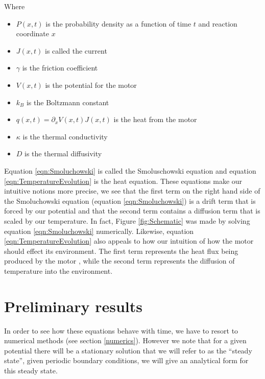 \documentclass[11pt]{article} %
\begin{document}
Where
\begin{itemize}
\item{$P(x, t)$ is the probability density as a function of time $t$  and reaction coordinate $x$}
\item{$J(x, t)$ is called the current}
\item{$\gamma$ is the friction coefficient}
\item{$V(x, t)$ is the potential for the motor}
\item{$k_B$ is the Boltzmann constant}
\item{$q(x, t) = \partial_x V(x, t) J(x, t)$ is the heat from the motor}
\item{$\kappa$ is the thermal conductivity}
\item{$D$ is the thermal diffusivity}
\end{itemize}

Equation \ref{eqn:Smoluchowski} is called the Smoluschowski equation \cite{KellerBustamante2000} and equation \ref{eqn:TemperatureEvolution} is the heat equation. These equations make our intuitive notions more precise, we see that the first term on the right hand side of the Smoluchowski equation (equation \ref{eqn:Smoluchowski}) is a drift term that is forced by our potential and that the second term contains a diffusion term that is scaled by our temperature. In fact, Figure \ref{fig:Schematic} was made by solving equation \ref{eqn:Smoluchowski} numerically. Likewise, equation \ref{eqn:TemperatureEvolution} also appeals to how our intuition of how the motor should effect its environment. The first term represents the heat flux being produced by the motor \cite{M.W.Jack2016}, while the second term represents the diffusion of temperature into the environment.


\section{Preliminary results}
 In order to see how these equations behave with time, we have to resort to numerical methods (see section \ref{numerics}). However we note that for a given potential there will be a stationary solution that we will refer to as the ``steady state'', given periodic boundary conditions, we will give an analytical form for this steady state. 
\end{document}
